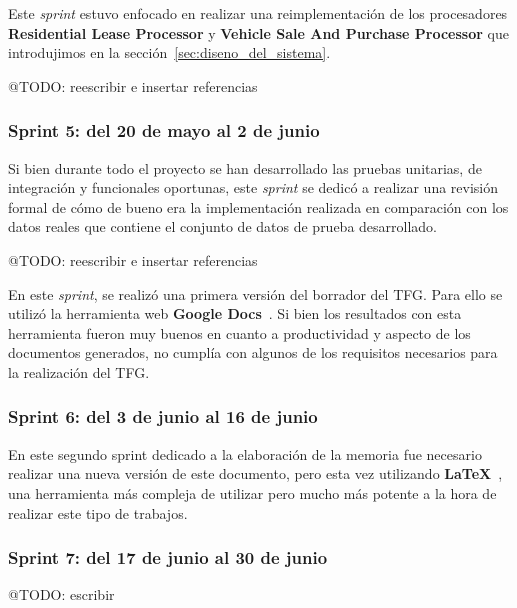 Este \textit{sprint} estuvo enfocado en realizar una reimplementación de los procesadores
\textbf{Residential Lease Processor} y \textbf{Vehicle Sale And Purchase Processor} que introdujimos en la
sección~\ref{sec:diseno_del_sistema}.

\colorbox{color_highlight}{@TODO: reescribir e insertar referencias}

\subsubsection{Sprint 5: del 20 de mayo al 2 de junio}

Si bien durante todo el proyecto se han desarrollado las pruebas unitarias, de integración y funcionales oportunas, este
\textit{sprint} se dedicó a realizar una revisión formal de cómo de bueno era la implementación realizada en comparación
con los datos reales que contiene el conjunto de datos de prueba desarrollado.

\colorbox{color_highlight}{@TODO: reescribir e insertar referencias}

En este \textit{sprint}, se realizó una primera versión del borrador del TFG. Para ello se utilizó la herramienta web
\textbf{Google Docs}~\cite{https://www.google.com/docs/about/}.
Si bien los resultados con esta herramienta fueron muy buenos en cuanto a productividad y aspecto de los documentos
generados, no cumplía con algunos de los requisitos necesarios para la realización del TFG.

\subsubsection{Sprint 6: del 3 de junio al 16 de junio}

En este segundo sprint dedicado a la elaboración de la memoria fue necesario realizar una nueva versión de este
documento, pero esta vez utilizando \textbf{LaTeX}~\cite{https://www.latex-project.org/}, una herramienta más compleja
de utilizar pero mucho más potente a la hora de realizar este tipo de trabajos.

\subsubsection{Sprint 7: del 17 de junio al 30 de junio}

\colorbox{color_highlight}{@TODO: escribir}